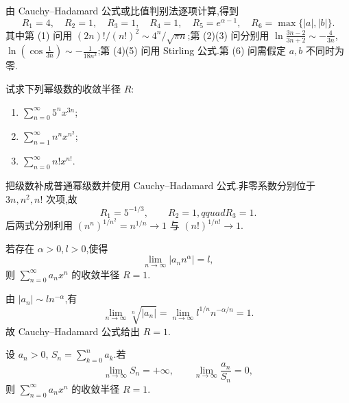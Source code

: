 \begin{solution}
    由 Cauchy--Hadamard 公式或比值判别法逐项计算,得到
    \[
        R_1=4,\quad R_2=1,\quad R_3=1,\quad R_4=1,
        \quad R_5=e^{\alpha-1},\quad R_6=\max\{|a|,|b|\}.
    \]
    其中第 (1) 问用 $(2n)!/(n!)^2\sim4^n/\sqrt{\pi n}$;第 (2)(3) 问分别用
    $\ln\frac{3n-2}{3n+2}\sim-\frac{4}{3n}$,$\ln(\cos\frac{1}{3n})\sim-\frac{1}{18n^2}$;第 (4)(5) 问用 Stirling 公式.第 (6) 问需假定 $a,b$ 不同时为零.
\end{solution}

\begin{example}
    试求下列幂级数的收敛半径 $R$:
    \begin{enumerate}
        \item $\displaystyle\sum\limits_{n=0}^{\infty}5^n x^{3n}$;
        \item $\displaystyle\sum\limits_{n=1}^{\infty}n^n x^{n^2}$;
        \item $\displaystyle\sum\limits_{n=0}^{\infty}n!x^{n!}$.
    \end{enumerate}
\end{example}
\exampleblank

\begin{solution}
    把级数补成普通幂级数并使用 Cauchy--Hadamard 公式.非零系数分别位于 $3n,n^2,n!$ 次项,故
    \[
        R_1=5^{-1/3},\qquad R_2=1,qquad R_3=1.
    \]
    后两式分别利用 $(n^n)^{1/n^2}=n^{1/n}\to1$ 与 $(n!)^{1/n!}\to1$.
\end{solution}

\begin{example}
    若存在 $\alpha>0,l>0$,使得
    \[
        \displaystyle\lim\limits_{n\to\infty}|a_nn^\alpha|=l,
    \]
    则 $\displaystyle\sum\limits_{n=0}^{\infty}a_nx^n$ 的收敛半径 $R=1$.
\end{example}
\exampleblank

\begin{solution}
    由 $|a_n|\sim l n^{-\alpha}$,有
    \[
        \displaystyle\lim\limits_{n\to\infty}\sqrt[n]{|a_n|}
        =\lim\limits_{n\to\infty}l^{1/n}n^{-\alpha/n}=1.
    \]
    故 Cauchy--Hadamard 公式给出 $R=1$.
\end{solution}

\begin{example}
    设 $a_n>0$, $S_n=\displaystyle\sum\limits_{k=0}^{n}a_k$.若
    \[
        \displaystyle\lim\limits_{n\to\infty}S_n=+\infty,
        \qquad
        \lim\limits_{n\to\infty}\dfrac{a_n}{S_n}=0,
    \]
    则 $\displaystyle\sum\limits_{n=0}^{\infty}a_nx^n$ 的收敛半径 $R=1$.
\end{example}
\exampleblank

